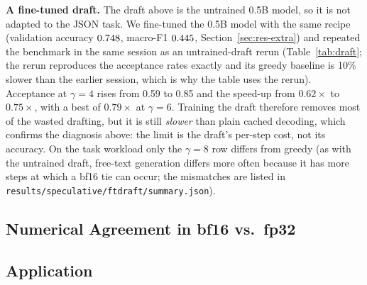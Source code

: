 \textbf{A fine-tuned draft.} The draft above is the untrained 0.5B model, so it is not adapted to the JSON task.
We fine-tuned the 0.5B model with the same recipe (validation accuracy $0.748$, macro-F1 $0.445$,
Section~\ref{sec:res-extra}) and repeated the benchmark in the same session as an untrained-draft rerun
(Table~\ref{tab:draft}; the rerun reproduces the acceptance rates exactly and its greedy baseline is 10\% slower
than the earlier session, which is why the table uses the rerun). Acceptance at $\gamma{=}4$ rises from 0.59 to
0.85 and the speed-up from $0.62\times$ to $0.75\times$, with a best of $0.79\times$ at $\gamma{=}6$. Training the
draft therefore removes most of the wasted drafting, but it is still \emph{slower} than plain cached decoding,
which confirms the diagnosis above: the limit is the draft's per-step cost, not its accuracy. On the task workload only the $\gamma{=}8$ row
differs from greedy (as with the untrained draft, free-text generation differs more often because it has more steps at which a bf16 tie can occur; the mismatches are listed in \texttt{results/speculative/ftdraft/summary.json}).


\subsection{Numerical Agreement in bf16 vs.\ fp32}\label{sec:res-numerics}


\subsection{Application}\label{sec:res-app}

